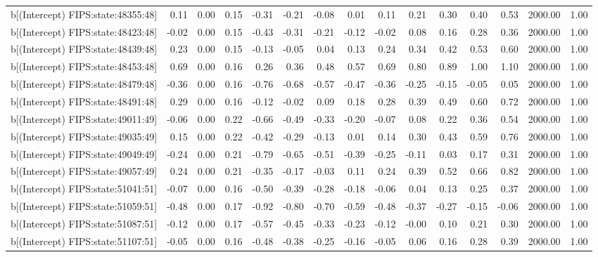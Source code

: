 \begin{table}[ht]
\begin{tabular}{rrrrrrrrrrrrrrr}
  b[(Intercept) FIPS:state:48355:48] & 0.11 & 0.00 & 0.15 & -0.31 & -0.21 & -0.08 & 0.01 & 0.11 & 0.21 & 0.30 & 0.40 & 0.53 & 2000.00 & 1.00 \\ 
  b[(Intercept) FIPS:state:48423:48] & -0.02 & 0.00 & 0.15 & -0.43 & -0.31 & -0.21 & -0.12 & -0.02 & 0.08 & 0.16 & 0.28 & 0.36 & 2000.00 & 1.00 \\ 
  b[(Intercept) FIPS:state:48439:48] & 0.23 & 0.00 & 0.15 & -0.13 & -0.05 & 0.04 & 0.13 & 0.24 & 0.34 & 0.42 & 0.53 & 0.60 & 2000.00 & 1.00 \\ 
  b[(Intercept) FIPS:state:48453:48] & 0.69 & 0.00 & 0.16 & 0.26 & 0.36 & 0.48 & 0.57 & 0.69 & 0.80 & 0.89 & 1.00 & 1.10 & 2000.00 & 1.00 \\ 
  b[(Intercept) FIPS:state:48479:48] & -0.36 & 0.00 & 0.16 & -0.76 & -0.68 & -0.57 & -0.47 & -0.36 & -0.25 & -0.15 & -0.05 & 0.05 & 2000.00 & 1.00 \\ 
  b[(Intercept) FIPS:state:48491:48] & 0.29 & 0.00 & 0.16 & -0.12 & -0.02 & 0.09 & 0.18 & 0.28 & 0.39 & 0.49 & 0.60 & 0.72 & 2000.00 & 1.00 \\ 
  b[(Intercept) FIPS:state:49011:49] & -0.06 & 0.00 & 0.22 & -0.66 & -0.49 & -0.33 & -0.20 & -0.07 & 0.08 & 0.22 & 0.36 & 0.54 & 2000.00 & 1.00 \\ 
  b[(Intercept) FIPS:state:49035:49] & 0.15 & 0.00 & 0.22 & -0.42 & -0.29 & -0.13 & 0.01 & 0.14 & 0.30 & 0.43 & 0.59 & 0.76 & 2000.00 & 1.00 \\ 
  b[(Intercept) FIPS:state:49049:49] & -0.24 & 0.00 & 0.21 & -0.79 & -0.65 & -0.51 & -0.39 & -0.25 & -0.11 & 0.03 & 0.17 & 0.31 & 2000.00 & 1.00 \\ 
  b[(Intercept) FIPS:state:49057:49] & 0.24 & 0.00 & 0.21 & -0.35 & -0.17 & -0.03 & 0.11 & 0.24 & 0.39 & 0.52 & 0.66 & 0.82 & 2000.00 & 1.00 \\ 
  b[(Intercept) FIPS:state:51041:51] & -0.07 & 0.00 & 0.16 & -0.50 & -0.39 & -0.28 & -0.18 & -0.06 & 0.04 & 0.13 & 0.25 & 0.37 & 2000.00 & 1.00 \\ 
  b[(Intercept) FIPS:state:51059:51] & -0.48 & 0.00 & 0.17 & -0.92 & -0.80 & -0.70 & -0.59 & -0.48 & -0.37 & -0.27 & -0.15 & -0.06 & 2000.00 & 1.00 \\ 
  b[(Intercept) FIPS:state:51087:51] & -0.12 & 0.00 & 0.17 & -0.57 & -0.45 & -0.33 & -0.23 & -0.12 & -0.00 & 0.10 & 0.21 & 0.30 & 2000.00 & 1.00 \\ 
  b[(Intercept) FIPS:state:51107:51] & -0.05 & 0.00 & 0.16 & -0.48 & -0.38 & -0.25 & -0.16 & -0.05 & 0.06 & 0.16 & 0.28 & 0.39 & 2000.00 & 1.00 \\ 

\end{tabular}
\end{table}
